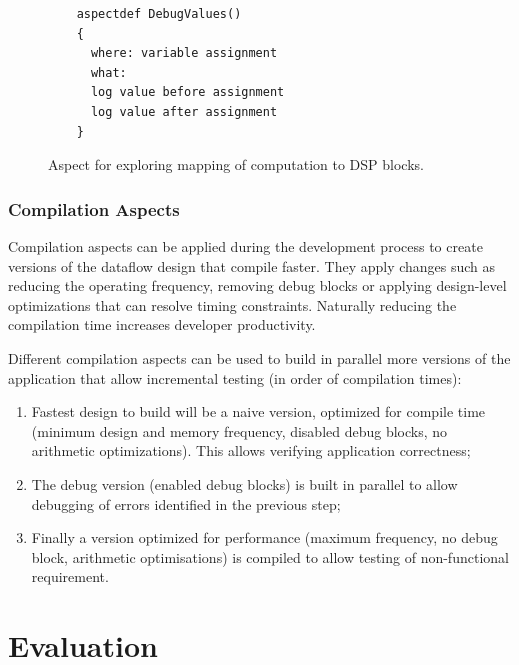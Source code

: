 \lstset{style=aspectp}
\begin{figure}[!h]
  \centering
  \begin{lstlisting}
    aspectdef DebugValues()
    {
      where: variable assignment
      what:
      log value before assignment
      log value after assignment
    }
  \end{lstlisting}
  \caption{Aspect for exploring mapping of computation to DSP blocks.}
  \label{fig:aspect-DSP}
\end{figure}

\subsubsection{Compilation Aspects}

Compilation aspects can be applied during the development process to
create versions of the dataflow design that compile faster. They apply
changes such as reducing the operating frequency, removing debug
blocks or applying design-level optimizations that can resolve timing
constraints. Naturally reducing the compilation time increases
developer productivity.

Different compilation aspects can be used to build in parallel more
versions of the application that allow incremental testing (in order
of compilation times):
\begin{enumerate}
\item Fastest design to build will be a naive version, optimized for
  compile time (minimum design and memory frequency, disabled debug
  blocks, no arithmetic optimizations). This allows verifying
  application correctness;
\item The debug version (enabled debug blocks) is built in parallel to
  allow debugging of errors identified in the previous step;
\item Finally a version optimized for performance (maximum frequency,
  no debug block, arithmetic optimisations) is compiled to allow
  testing of non-functional requirement.
\end{enumerate}

\section{Evaluation}

